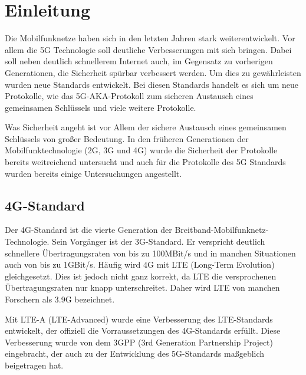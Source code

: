\chapter{Einleitung}
\label{chap:1}

Die Mobilfunknetze haben sich in den letzten Jahren stark weiterentwickelt. %
Vor allem die 5G Technologie soll deutliche Verbesserungen mit sich bringen. 
Dabei soll neben deutlich schnellerem Internet auch, im Gegensatz zu vorherigen Generationen, die Sicherheit sp\"urbar verbessert werden.
Um dies zu gew\"ahrleisten wurden neue Standards entwickelt. 
Bei diesen Standards handelt es sich um neue Protokolle, wie das 5G-AKA-Protokoll zum sicheren Austausch eines gemeinsamen Schl\"ussels und viele weitere Protokolle.

Was Sicherheit angeht ist vor Allem der sichere Austausch eines gemeinsamen Schl\"ussels von gro{\ss}er Bedeutung. 
In den fr\"uheren Generationen der Mobilfunktechnologie (2G, 3G und 4G) wurde die Sicherheit der Protokolle bereits weitreichend untersucht und auch f\"ur die Protokolle des 5G Standards wurden bereits einige Untersuchungen angestellt. %


\section{4G-Standard}
Der 4G-Standard ist die vierte Generation der Breitband-Mobilfunknetz-Technologie. %
Sein Vorg\"anger ist der 3G-Standard. 
Er verspricht deutlich schnellere \"Ubertragungsraten von bis zu 100MBit/s und in manchen Situationen auch von bis zu 1GBit/s. %
H\"aufig wird 4G mit LTE (Long-Term Evolution) gleichgesetzt. %
Dies ist jedoch nicht ganz korrekt, da LTE die versprochenen \"Ubertragungsraten nur knapp unterschreitet. 
Daher wird LTE von manchen Forschern als 3.9G bezeichnet. %

Mit LTE-A (LTE-Advanced) wurde eine Verbesserung des LTE-Standards entwickelt, der offiziell die Vorraussetzungen des 4G-Standards erf\"ullt. %
Diese Verbesserung wurde von dem 3GPP (3rd Generation Partnership Project) eingebracht, der auch zu der Entwicklung des 5G-Standards ma{\ss}geblich beigetragen hat. %


